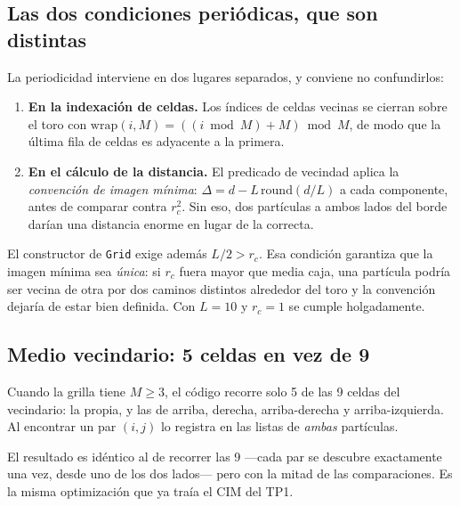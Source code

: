 \documentclass[11pt]{article}
\begin{document}

\subsection{Las dos condiciones periódicas, que son distintas}

La periodicidad interviene en dos lugares separados, y conviene no confundirlos:

\begin{enumerate}
  \item \textbf{En la indexación de celdas.} Los índices de celdas vecinas se
    cierran sobre el toro con $\mathrm{wrap}(i, M) = ((i \bmod M) + M) \bmod M$,
    de modo que la última fila de celdas es adyacente a la primera.
  \item \textbf{En el cálculo de la distancia.} El predicado de vecindad aplica
    la \emph{convención de imagen mínima}:
    $\Delta = d - L\,\mathrm{round}(d/L)$ a cada componente, antes de comparar
    contra $r_c^2$. Sin eso, dos partículas a ambos lados del borde darían una
    distancia enorme en lugar de la correcta.
\end{enumerate}

El constructor de \texttt{Grid} exige además $L/2 > r_c$. Esa condición
garantiza que la imagen mínima sea \emph{única}: si $r_c$ fuera mayor que media
caja, una partícula podría ser vecina de otra por dos caminos distintos
alrededor del toro y la convención dejaría de estar bien definida. Con $L=10$ y
$r_c=1$ se cumple holgadamente.

\subsection{Medio vecindario: 5 celdas en vez de 9}

Cuando la grilla tiene $M \geq 3$, el código recorre solo 5 de las 9 celdas del
vecindario: la propia, y las de arriba, derecha, arriba-derecha y
arriba-izquierda. Al encontrar un par $(i,j)$ lo registra en las listas de
\emph{ambas} partículas.

El resultado es idéntico al de recorrer las 9 ---cada par se descubre
exactamente una vez, desde uno de los dos lados--- pero con la mitad de las
comparaciones. Es la misma optimización que ya traía el CIM del TP1.
\end{document}
